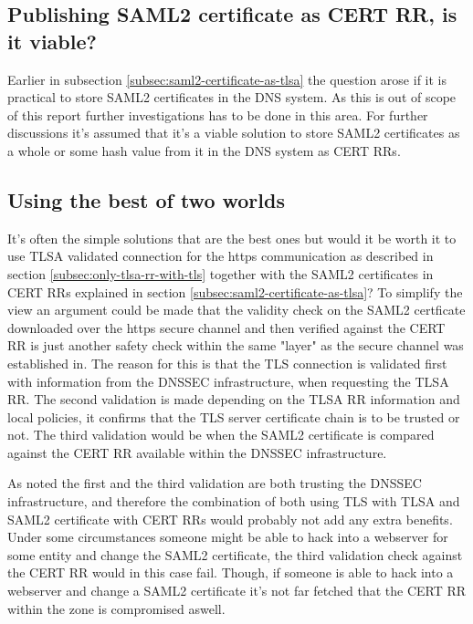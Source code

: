 
\subsection{Publishing SAML2 certificate as CERT RR, is it viable?}
\label{subsec:saml2-certs-in-cert-rr}
Earlier in subsection \ref{subsec:saml2-certificate-as-tlsa} the question arose if it is practical to store SAML2 certificates in the DNS system.
As this is out of scope of this report further investigations has to be done in this area.
For further discussions it's assumed that it's a viable solution to store SAML2 certificates as a whole or some hash value from it in the DNS system as CERT RRs.

\subsection{Using the best of two worlds}
It's often the simple solutions that are the best ones but would it be worth it to use TLSA validated connection for the https communication as described in section \ref{subsec:only-tlsa-rr-with-tls} together with the SAML2 certificates in CERT RRs explained in section \ref{subsec:saml2-certificate-as-tlsa}?
To simplify the view an argument could be made that the validity check on the SAML2 certficate downloaded over the https secure channel and then verified against the CERT RR is just another safety check within the same "layer" as the secure channel was established in.
The reason for this is that the TLS connection is validated first with information from the DNSSEC infrastructure, when requesting the TLSA RR.
The second validation is made depending on the TLSA RR information and local policies, it confirms that the TLS server certificate chain is to be trusted or not.
The third validation would be when the SAML2 certificate is compared against the CERT RR available within the DNSSEC infrastructure.

As noted the first and the third validation are both trusting the DNSSEC infrastructure, and therefore the combination of both using TLS with TLSA and SAML2 certificate with CERT RRs would probably not add any extra benefits.
Under some circumstances someone might be able to hack into a webserver for some entity and change the SAML2 certificate, the third validation check against the CERT RR would in this case fail.
Though, if someone is able to hack into a webserver and change a SAML2 certificate it's not far fetched that the CERT RR within the zone is compromised aswell.


